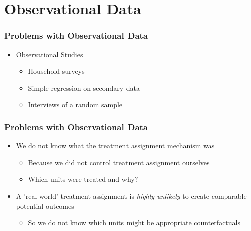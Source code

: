 \documentclass[xcolor=x11names,compress]{beamer}\usepackage[]{graphicx}\usepackage[]{color}
\renewcommand{\(}{\begin{columns}}
\renewcommand{\)}{\end{columns}}
\newcommand{\<}[1]{\begin{column}{#1}}
\renewcommand{\>}{\end{column}}
\begin{document}
\section{Observational Data}

\begin{frame}
\frametitle{Problems with Observational Data}
\begin{itemize}
\item Observational Studies
\pause
\begin{itemize}
\item Household surveys
\item Simple regression on secondary data
\item Interviews of a random sample
\end{itemize}
\end{itemize}
\end{frame}

\begin{frame}
\frametitle{Problems with Observational Data}
\begin{itemize}
\item We do not know what the treatment assignment mechanism was
\pause
\begin{itemize}
\item Because we did not control treatment assignment ourselves
\item Which units were treated and why?
\pause
\end{itemize}
\item A 'real-world' treatment assignment is \textit{highly unlikely} to create comparable potential outcomes
\pause
\begin{itemize}
\item So we do not know which units might be appropriate counterfactuals
\end{itemize}
\end{itemize}
\end{frame}
\end{document}
